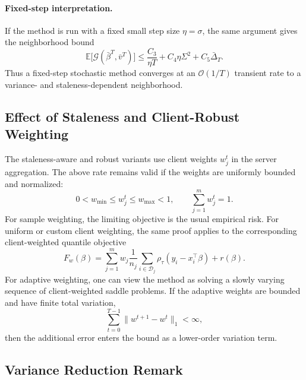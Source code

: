 \paragraph{Fixed-step interpretation.}
If the method is run with a fixed small step size $\eta=\sigma$, the same
argument gives the neighborhood bound
\begin{equation}
    \mathbb{E}\big[
    \mathcal{G}(\bar{\beta}^T,\bar{v}^T)
    \big]
    \le
    \frac{C_3}{\eta T}
    +
    C_4 \eta \Sigma^2
    +
    C_5 \bar{\Delta}_T .
    \label{eq:fixed-step-rate}
\end{equation}
Thus a fixed-step stochastic method converges at an $\mathcal{O}(1/T)$
transient rate to a variance- and staleness-dependent neighborhood.

\subsection{Effect of Staleness and Client-Robust Weighting}

The staleness-aware and robust variants use client weights $w_j^t$ in the
server aggregation. The above rate remains valid if the weights are uniformly
bounded and normalized:
\begin{equation}
    0 < w_{\min} \le w_j^t \le w_{\max}<1,
    \qquad
    \sum_{j=1}^m w_j^t = 1 .
\end{equation}
For sample weighting, the limiting objective is the usual empirical risk.
For uniform or custom client weighting, the same proof applies to the
corresponding client-weighted quantile objective
\begin{equation}
    F_w(\beta)
    =
    \sum_{j=1}^m w_j
    \frac{1}{n_j}\sum_{i\in\mathcal{D}_j}
    \rho_\tau(y_i-x_i^\top\beta)
    + r(\beta).
\end{equation}
For adaptive weighting, one can view the method as solving a slowly varying
sequence of client-weighted saddle problems. If the adaptive weights are
bounded and have finite total variation,
\begin{equation}
    \sum_{t=0}^{T-1}\|w^{t+1}-w^t\|_1 < \infty ,
\end{equation}
then the additional error enters the bound as a lower-order variation term.

\subsection{Variance Reduction Remark}

